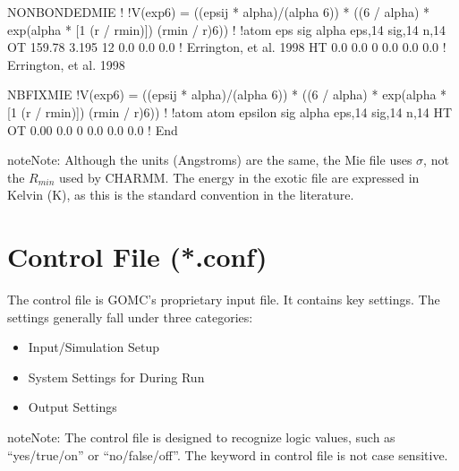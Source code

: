 \documentclass[letterpaper,10pt,english]{sphinxmanual}
\begin{document}
\begin{sphinxVerbatim}[commandchars=\\\{\}]
NONBONDED\PYGZus{}MIE
!
!V(exp\PYGZhy{}6) = ((eps\PYGZhy{}ij * alpha)/(alpha \PYGZhy{} 6)) * ((6 / alpha) * exp(alpha * [1 \PYGZhy{} (r / rmin)]) \PYGZhy{} (rmin / r)\PYGZca{}6))
!
!atom eps       sig     alpha     eps,1\PYGZhy{}4   sig,1\PYGZhy{}4   n,1\PYGZhy{}4
OT    159.78    3.195   12        0.0       0.0       0.0 ! Errington, et al. 1998
HT      0.0     0.0      0        0.0       0.0       0.0 ! Errington, et al. 1998

NBFIX\PYGZus{}MIE
!V(exp\PYGZhy{}6) = ((eps\PYGZhy{}ij * alpha)/(alpha \PYGZhy{} 6)) * ((6 / alpha) * exp(alpha * [1 \PYGZhy{} (r / rmin)]) \PYGZhy{} (rmin / r)\PYGZca{}6))
!
!atom atom  epsilon  sig     alpha     eps,1\PYGZhy{}4   sig,1\PYGZhy{}4   n,1\PYGZhy{}4
HT   OT      0.00    0.0     0         0.0       0.0       0.0 !
End
\end{sphinxVerbatim}

\begin{sphinxadmonition}{note}{Note:}
\sphinxAtStartPar
Although the units (Angstroms) are the same, the Mie file uses \(\sigma\), not the \(R_{min}\) used by CHARMM. The energy in the exotic file are expressed in Kelvin (K), as this is the standard convention in the literature.
\end{sphinxadmonition}


\section{Control File (*.conf)}
\label{\detokenize{input_file:control-file-conf}}
\sphinxAtStartPar
The control file is GOMC’s proprietary input file. It contains key settings. The settings generally fall under three categories:
\begin{itemize}
\item {} 
\sphinxAtStartPar
Input/Simulation Setup

\item {} 
\sphinxAtStartPar
System Settings for During Run

\item {} 
\sphinxAtStartPar
Output Settings

\end{itemize}

\begin{sphinxadmonition}{note}{Note:}
\sphinxAtStartPar
The control file is designed to recognize logic values, such as “yes/true/on” or “no/false/off”. The keyword in control file is not case sensitive.
\end{sphinxadmonition}
\end{document}
